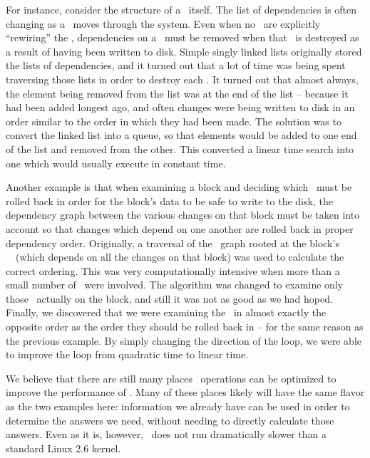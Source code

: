 For instance, consider the structure of a \chdesc\ itself. The list of
dependencies is often changing as a \chdesc\ moves through the system. Even
when no \modules\ are explicitly ``rewiring'' the \chdescs, dependencies on a
\chdesc\ must be removed when that \chdesc\ is destroyed as a result of having
been written to disk. Simple singly linked lists originally stored the lists of
dependencies, and it turned out that a lot of time was being spent traversing
those lists in order to destroy each \chdesc. It turned out that almost always,
the element being removed from the list was at the end of the list -- because
it had been added longest ago, and often changes were being written to disk in
an order similar to the order in which they had been made. The solution was to
convert the linked list into a queue, so that elements would be added to one
end of the list and removed from the other. This converted a linear time search
into one which would usually execute in constant time.

Another example is that when examining a block and deciding which \chdescs\ must
be rolled back in order for the block's data to be safe to write to the disk,
the dependency graph between the various changes on that block must be taken
into account so that changes which depend on one another are rolled back in
proper dependency order. Originally, a traversal of the \chdesc\ graph rooted at
the block's \noop\ \chdesc\ (which depends on all the changes on that block) was
used to calculate the correct ordering. This was very computationally intensive
when more than a small number of \chdescs\ were involved. The algorithm was
changed to examine only those \chdescs\ actually on the block, and still it was
not as good as we had hoped. Finally, we discovered that we were examining the
\chdescs\ in almost exactly the opposite order as the order they should be
rolled back in -- for the same reason as the previous example. By simply
changing the direction of the loop, we were able to improve the loop from
quadratic time to linear time.

We believe that there are still many places \chdesc\ operations can be
optimized to improve the performance of \Kudos. Many of these places likely
will have the same flavor as the two examples here: information we already have
can be used in order to determine the answers we need, without needing to
directly calculate those answers. Even as it is, however, \Kudos\ does not run
dramatically slower than a standard Linux 2.6 kernel.

